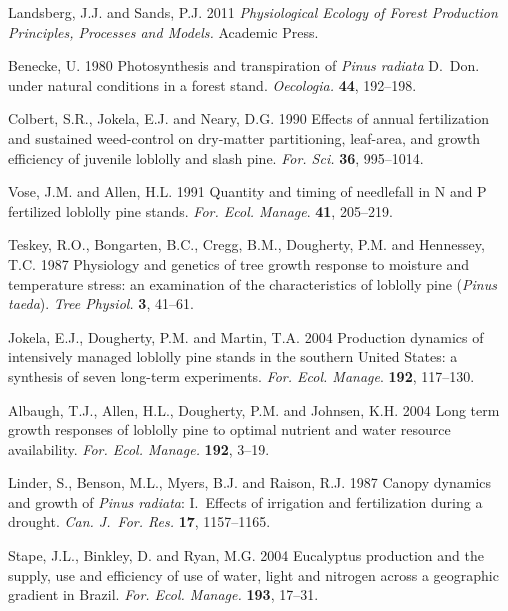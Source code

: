 \documentclass[final]{foresj}
\begin{document}
\begin{thebibliography}
Landsberg, J.J. and Sands, P.J. 2011 \textit{Physiological
Ecology of Forest Production Principles, Processes and
Models.} Academic Press.

Benecke, U. 1980 Photosynthesis and transpiration of
\textit{Pinus radiata} D.~Don. under natural conditions in
a forest stand. \textit{Oecologia.} \textbf{44}, 192--198.

Colbert, S.R., Jokela, E.J. and Neary, D.G. 1990 Effects of
annual fertilization and sustained weed-control on
dry-matter partitioning, leaf-area, and growth efficiency
of juvenile loblolly and slash pine. \textit{For. Sci.}
\textbf{36}, 995--1014.

Vose, J.M. and Allen, H.L. 1991 Quantity and timing of
needlefall in N and P fertilized loblolly pine stands.
\textit{For. Ecol. Manage}. \textbf{41}, 205--219.

Teskey, R.O., Bongarten, B.C., Cregg, B.M., Dougherty, P.M.
and \hbox{Hennessey}, T.C.\vadjust{\vfill\pagebreak} 1987 Physiology and genetics of tree
growth response to moisture and temperature stress: an
examination of the characteristics of loblolly pine
(\textit{Pinus taeda}). \textit{Tree Physiol.} \textbf{3}, 41--61.

Jokela, E.J., Dougherty, P.M. and Martin, T.A. 2004
Production dynamics of intensively managed loblolly pine
stands in the southern United States: a synthesis of seven
long-term experiments. \textit{For. Ecol. Manage}.
\textbf{192}, 117--130.

Albaugh, T.J., Allen, H.L., Dougherty, P.M. and Johnsen,
K.H. 2004 Long term growth responses of loblolly pine to
optimal nutrient and water resource availability.
\textit{For. Ecol. Manage.} \textbf{192}, 3--19.

Linder, S., Benson, M.L., Myers, B.J. and Raison, R.J. 1987
Canopy dynamics and growth of \textit{Pinus radiata}:
I.~Effects of irrigation and fertilization during a
drought. \textit{Can. J.~For. Res.} \textbf{17}, 1157--1165.

Stape, J.L., Binkley, D. and Ryan, M.G. 2004 Eucalyptus
production and the supply, use and efficiency of use of
water, light and nitrogen across a geographic gradient in
Brazil. \textit{For. Ecol. Manage.} \textbf{193}, 17--31.



\end{thebibliography}
\end{document}
